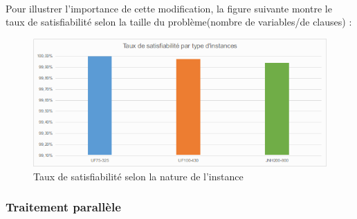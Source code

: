 	\newpage
	
	\paragraph{}
	Pour illustrer l'importance de cette modification, la figure suivante montre le taux de satisfiabilité selon la taille du problème(nombre de variables/de clauses) : 
	\begin{figure}[H]
		\centering
		\includegraphics[width=\textwidth]{images/uf75_uf100_jnh200.png}
		\caption{Taux de satisfiabilité selon la nature de l'instance}
	\end{figure}
	
	\subsubsection{Traitement parallèle}

